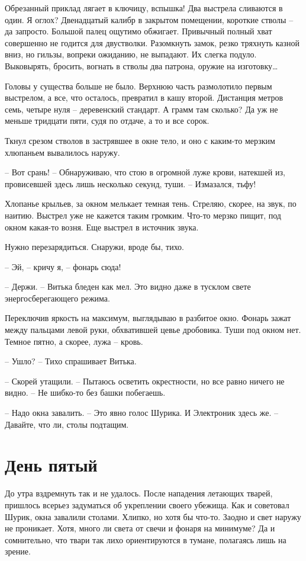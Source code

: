 \documentclass[a4paper]{book}
\begin{document}
Обрезанный приклад лягает в ключицу, вспышка! Два выстрела сливаются в один. Я оглох? Двенадцатый калибр в закрытом помещении, короткие стволы -- да запросто. Большой палец ощутимо обжигает. Привычный полный хват совершенно не годится для двустволки. Разомкнуть замок, резко тряхнуть казной вниз, но гильзы, вопреки ожиданию, не выпадают. Их слегка подуло. Выковырять, бросить, вогнать в стволы два патрона, оружие на изготовку\ldots

Головы у существа больше не было. Верхнюю часть размолотило первым выстрелом, а все, что осталось, превратил в кашу второй. Дистанция метров семь, четыре нуля -- деревенский стандарт. А грамм там сколько? Да уж не меньше тридцати пяти, судя по отдаче, а то и все сорок.

Ткнул срезом стволов в застрявшее в окне тело, и оно с каким-то мерзким хлюпаньем вывалилось наружу. 

-- Вот срань! -- Обнаруживаю, что стою в огромной луже крови, натекшей из, провисевшей здесь лишь несколько секунд, туши. -- Измазался, тьфу!

Хлопанье крыльев, за окном мелькает темная тень. Стреляю, скорее, на звук, по наитию. Выстрел уже не кажется таким громким. Что-то мерзко пищит, под окном какая-то возня. Еще выстрел в источник звука. 

Нужно перезарядиться. Снаружи, вроде бы, тихо.

-- Эй, -- кричу я, -- фонарь сюда!

-- Держи. -- Витька бледен как мел. Это видно даже в тусклом свете энергосберегающего режима. 

Переключив яркость на максимум, выглядываю в разбитое окно. Фонарь зажат между пальцами левой руки, обхватившей цевье дробовика. Туши под окном нет. Темное пятно, а скорее, лужа -- кровь. 

-- Ушло? -- Тихо спрашивает Витька. 

-- Скорей утащили. -- Пытаюсь осветить окрестности, но все равно ничего не видно. -- Не шибко-то без башки побегаешь. 

-- Надо окна завалить. -- Это явно голос Шурика. И Электроник здесь же. -- Давайте, что ли, столы подтащим.

\chapter{День пятый}

До утра вздремнуть так и не удалось. После нападения летающих тварей, пришлось всерьез задуматься об укреплении своего убежища. Как и советовал Шурик, окна завалили столами. Хлипко, но хотя бы что-то. Заодно и свет наружу не проникает. Хотя, много ли света от свечи и фонаря на минимуме? Да и сомнительно, что твари так лихо ориентируются в тумане, полагаясь лишь на зрение. 
\end{document}
